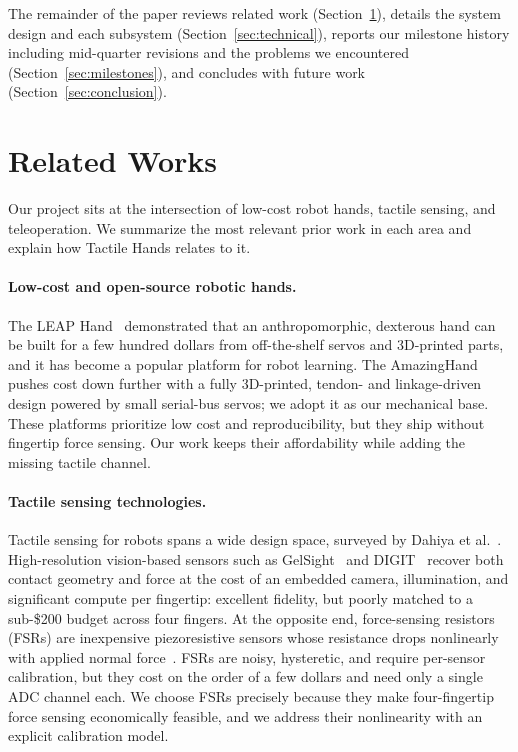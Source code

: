\documentclass[acmlarge,screen,nonacm]{acmart}
\begin{document}
The remainder of the paper reviews related work
(Section~\ref{sec:related}), details the system design and each subsystem
(Section~\ref{sec:technical}), reports our milestone history including
mid-quarter revisions and the problems we encountered
(Section~\ref{sec:milestones}), and concludes with future work
(Section~\ref{sec:conclusion}).

\section{Related Works}
\label{sec:related}
Our project sits at the intersection of low-cost robot hands, tactile sensing,
and teleoperation. We summarize the most relevant prior work in each area and
explain how Tactile Hands relates to it.

\paragraph{Low-cost and open-source robotic hands.}
The LEAP Hand~\cite{shaw2023leap} demonstrated that an anthropomorphic,
dexterous hand can be built for a few hundred dollars from off-the-shelf servos
and 3D-printed parts, and it has become a popular platform for robot learning.
The AmazingHand~\cite{pollen2025amazinghand} pushes cost down further with a
fully 3D-printed, tendon- and linkage-driven design powered by small serial-bus
servos; we adopt it as our mechanical base. These platforms prioritize low cost
and reproducibility, but they ship without fingertip force sensing. Our
work keeps their affordability while adding the missing tactile channel.

\paragraph{Tactile sensing technologies.}
Tactile sensing for robots spans a wide design space, surveyed by Dahiya et
al.~\cite{dahiya2010tactile}. High-resolution vision-based sensors such as
GelSight~\cite{yuan2017gelsight} and DIGIT~\cite{lambeta2020digit} recover both
contact geometry and force at the cost of an embedded camera, illumination, and
significant compute per fingertip: excellent fidelity, but poorly matched to a
sub-\$200 budget across four fingers. At the opposite end, force-sensing
resistors (FSRs) are inexpensive piezoresistive sensors whose resistance drops
nonlinearly with applied normal force~\cite{interlink2024fsr}. FSRs are noisy,
hysteretic, and require per-sensor calibration, but they cost on the order of a
few dollars and need only a single ADC channel each. We choose FSRs precisely
because they make four-fingertip force sensing economically feasible, and we
address their nonlinearity with an explicit calibration model.
\end{document}
